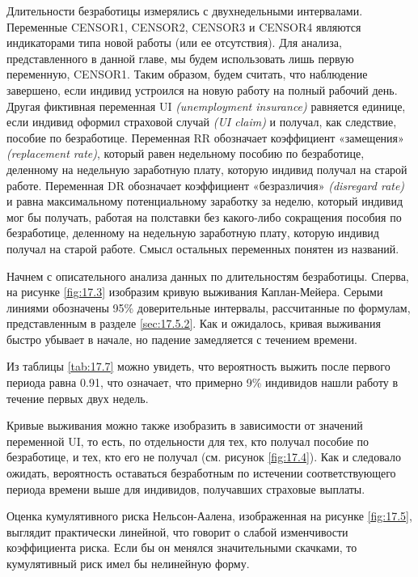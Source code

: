 Длительности безработицы измерялись с двухнедельными интервалами. Переменные CENSOR1, CENSOR2, CENSOR3 и CENSOR4 являются индикаторами типа новой работы (или ее отсутствия). Для анализа, представленного в данной главе, мы будем использовать лишь первую переменную, CENSOR1. Таким образом, будем считать, что наблюдение завершено, если индивид устроился на новую работу на полный рабочий день. Другая фиктивная переменная UI \textit{(unemployment insurance)} равняется единице, если индивид оформил страховой случай \textit{(UI claim)} и получал, как следствие, пособие по безработице. Переменная RR обозначает коэффициент «замещения» \textit{(replacement rate)}, который равен недельному пособию по безработице, деленному на недельную заработную плату, которую индивид получал на старой работе. Переменная DR обозначает коэффициент «безразличия» \textit{(disregard rate)} и равна максимальному потенциальному заработку за неделю, который индивид мог бы получать, работая на полставки без какого-либо сокращения пособия по безработице, деленному на недельную заработную плату, которую индивид получал на старой работе. Смысл остальных переменных понятен из названий.

Начнем с описательного анализа данных по длительностям безработицы. Сперва, на рисунке \ref{fig:17.3} изобразим кривую выживания Каплан-Мейера. Серыми линиями обозначены 95\% доверительные интервалы, рассчитанные по формулам, представленным в разделе \ref{sec:17.5.2}. Как и ожидалось, кривая выживания быстро убывает в начале, но падение замедляется с течением времени.

Из таблицы \ref{tab:17.7} можно увидеть, что вероятность выжить после первого периода равна 0.91, что означает, что примерно 9\% индивидов нашли работу в течение первых двух недель.

Кривые выживания можно также изобразить в зависимости от значений переменной UI, то есть, по отдельности для тех, кто получал пособие по безработице, и тех, кто его не получал (см. рисунок \ref{fig:17.4}). Как и следовало ожидать, вероятность оставаться безработным по истечении соответствующего периода времени выше для индивидов, получавших страховые выплаты.

Оценка кумулятивного риска Нельсон-Аалена, изображенная на рисунке \ref{fig:17.5}, выглядит практически линейной, что говорит о слабой изменчивости коэффициента риска. Если бы он менялся значительными скачками, то кумулятивный риск имел бы нелинейную форму.

